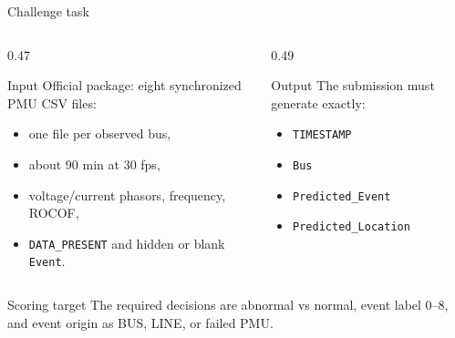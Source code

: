 \documentclass[aspectratio=169,10pt,t]{beamer}
\newcommand{\code}[1]{\texttt{\footnotesize #1}}
\begin{document}
\iffalse
\begin{frame}{Challenge task}
\small
\begin{columns}[T,totalwidth=\textwidth]
\begin{column}{0.47\textwidth}
\begin{block}{Input}
Official package: eight synchronized PMU CSV files:
\begin{itemize}
  \item one file per observed bus,
  \item about 90 min at 30 fps,
  \item voltage/current phasors, frequency, ROCOF,
  \item \code{DATA\_PRESENT} and hidden or blank \code{Event}.
\end{itemize}
\end{block}
\end{column}
\begin{column}{0.49\textwidth}
\begin{alertblock}{Output}
The submission must generate exactly:
\begin{itemize}
  \item \code{TIMESTAMP}
  \item \code{Bus}
  \item \code{Predicted\_Event}
  \item \code{Predicted\_Location}
\end{itemize}
\end{alertblock}
\end{column}
\end{columns}
\vspace{2mm}
\begin{exampleblock}{Scoring target}
The required decisions are abnormal vs normal, event label 0--8, and event origin as BUS, LINE, or failed PMU.
\end{exampleblock}
\end{frame}
\end{document}

